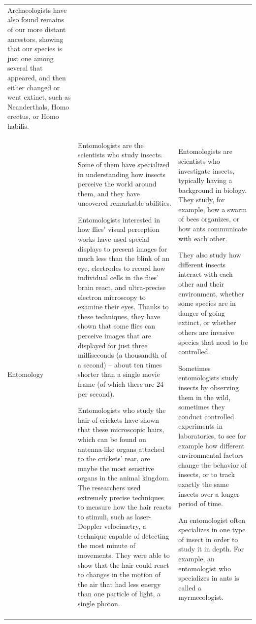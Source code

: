\documentclass[
  doc,floatsintext]{apa6}
\begin{document}
\begin{longtable}[t]{>{\raggedright\arraybackslash}p{5em}>{\raggedright\arraybackslash}p{25em}>{\raggedright\arraybackslash}p{25em}}
Archaeologists have also found remains of our more distant ancestors, showing that our species is just one among several that appeared, and then either changed or went extinct, such as Neanderthals, Homo erectus, or Homo habilis.\\
Entomology & Entomologists are the scientists who study insects. Some of them have specialized in understanding how insects perceive the world around them, and they have uncovered remarkable abilities. 

Entomologists interested in how flies’ visual perception works have used special displays to present images for much less than the blink of an eye, electrodes to record how individual cells in the flies’ brain react, and ultra-precise electron microscopy to examine their eyes. Thanks to these techniques, they have shown that some flies can perceive images that are displayed for just three milliseconds (a thousandth of a second) – about ten times shorter than a single movie frame (of which there are 24 per second). 

Entomologists who study the hair of crickets have shown that these microscopic hairs, which can be found on antenna-like organs attached to the crickets’ rear, are maybe the most sensitive organs in the animal kingdom. The researchers used extremely precise techniques to measure how the hair reacts to stimuli, such as laser-Doppler velocimetry, a technique capable of detecting the most minute of movements. They were able to show that the hair could react to changes in the motion of the air that had less energy than one particle of light, a single photon. & Entomologists are scientists who investigate insects, typically having a background in biology. They study, for example, how a swarm of bees organizes, or how ants communicate with each other. 

They also study how different insects interact with each other and their environment, whether some species are in danger of going extinct, or whether others are invasive species that need to be controlled.

Sometimes entomologists study insects by observing them in the wild, sometimes they conduct controlled experiments in laboratories, to see for example how different environmental factors change the behavior of insects, or to track exactly the same insects over a longer period of time.

An entomologist often specializes in one type of insect in order to study it in depth. For example, an entomologist who specializes in ants is called a myrmecologist.\\*
\end{longtable}
\endgroup{}
\end{document}
